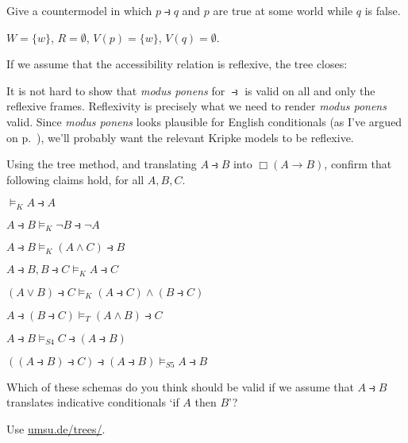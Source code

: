 \begin{exercise}
  Give a countermodel in which $p \strictif q$ and $p$ are true at some world
  while $q$ is false.
\end{exercise}
\begin{solution}
  $W = \{ w \}$, $R = \emptyset$, $V(p) = \{ w \} $, $V(q)=\emptyset$.
\end{solution}

If we assume that the accessibility relation is reflexive, the tree closes:
\begin{center}
\end{center}

It is not hard to show that \emph{modus ponens} for $\strictif$ is valid on all
and only the reflexive frames. Reflexivity is precisely what we need to render
\emph{modus ponens} valid. Since \emph{modus ponens} looks plausible for English
conditionals (as I've argued on p.~\pageref{p:mp}), we'll probably want the
relevant Kripke models to be reflexive.

\begin{exercise}\label{ex:sda-import}
  Using the tree method, and translating $A \strictif B$ into $\Box(A \to B)$, confirm that following claims hold, for all $A,B,C$.
  \begin{exlist}
  \item $\models_K A \strictif A$
  \item $A \strictif B \models_K \neg B \strictif \neg A$
  \item $A \strictif B \models_K (A \land C) \strictif B$
  \item $A\strictif B, B \strictif C \models_{K} A \strictif C$
  \item $(A \lor B) \strictif C \models_K (A \strictif C) \land (B \strictif C)$
  \item $A \strictif (B \strictif C) \models_T (A \land B) \strictif C$
  \item $A\strictif B \models_{S4} C \strictif (A \strictif B)$
  \item $((A\strictif B) \strictif C) \strictif (A\strictif B) \models_{S5} A\strictif B$
  \end{exlist}
  \medskip

  Which of these schemas do you think should be valid if we
  assume that $A \strictif B$ translates indicative conditionals `if $A$ then $B$'?
\end{exercise}
\begin{solution}
  Use \href{https://www.umsu.de/trees/}{umsu.de/trees/}.
\end{solution}

